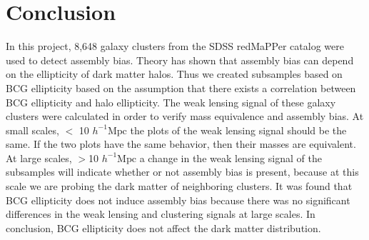 \documentclass[iop]{emulateapj}
\begin{document}
\section{Conclusion}
In this project, 8,648 galaxy clusters from the SDSS redMaPPer catalog were used to detect assembly bias. Theory has shown that assembly bias can depend on the ellipticity of dark matter halos. Thus we created subsamples based on BCG ellipticity based on the assumption that there exists a correlation between BCG ellipticity and halo ellipticity. The weak lensing signal of these galaxy clusters were calculated in order to verify mass equivalence and assembly bias. At small scales, $<$ 10 $h^{-1} \mathrm{Mpc}$ the plots of the weak lensing signal should be the same. If the two plots have the same behavior, then their masses are equivalent. At large scales, $>$10 $h^{-1} \mathrm{Mpc}$ a change in the weak lensing signal of the subsamples will indicate whether or not assembly bias is present, because at this scale we are probing the dark matter of neighboring clusters. It was found that BCG ellipticity does not induce assembly bias because there was no significant differences in the weak lensing and clustering signals at large scales. In conclusion, BCG ellipticity does not affect the dark matter distribution.




\end{document}
